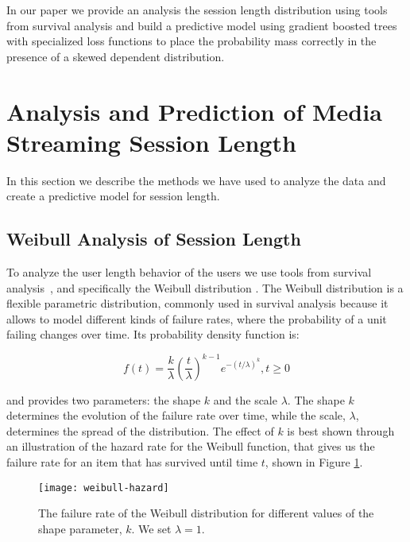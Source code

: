 In our paper we provide an analysis the session length distribution using
tools from survival analysis and build a predictive model using gradient boosted trees with specialized
loss functions to place the probability mass correctly in the presence of a
skewed dependent distribution.

\section{Analysis and Prediction of Media Streaming Session Length}
\label{sec:session-length-method}

In this section we describe the methods we have used to analyze the data
and create a predictive model for session length.

\subsection{Weibull Analysis of Session Length}

To analyze the user length behavior of the users we use tools from survival analysis~\cite{survival-analysis}, and specifically the Weibull distribution
\cite{weibull-survival}. The Weibull distribution is a flexible parametric distribution,
commonly used in survival analysis because it allows to model different kinds of failure
rates, where the probability of a unit failing changes over time. Its probability
density function is:

\begin{equation}
\label{eq:weibull-pdf}
f(t) = \frac{k}{\lambda}\left( \frac{t}{\lambda}\right)^{k-1}e^{-(t/\lambda)^k}, t \geq 0
\end{equation}


\noindent
and provides two parameters: the shape $k$ and the scale $\lambda$. The shape $k$ determines
the evolution of the failure rate over time, while the scale, $\lambda$, determines the spread
of the distribution. The effect of $k$ is best shown through an illustration of the hazard rate
for the Weibull function, that gives us the failure rate for an item that has survived until time
$t$, shown in Figure \ref{fig:weibull-failure-rate}.

\begin{figure}
	\centering
	\texttt{[image: weibull-hazard]}
	\caption{The failure rate of the Weibull distribution for different values of the shape parameter, $k$. We set $\lambda = 1$.}
	\label{fig:weibull-failure-rate}
\end{figure}

